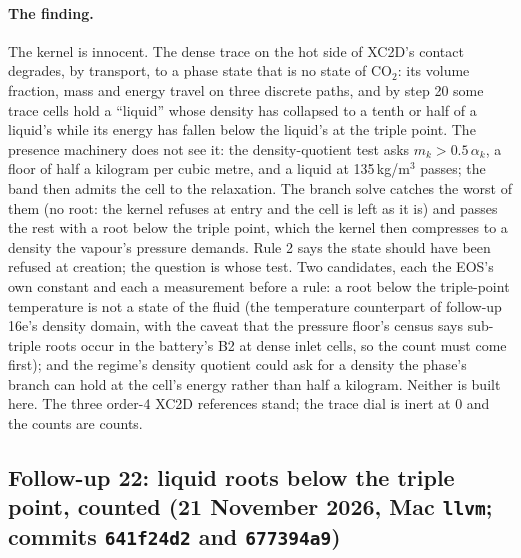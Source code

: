 \documentclass[11pt,a4paper]{article}
\newcommand{\code}[1]{\texttt{\small #1}}
\begin{document}
\paragraph{The finding.}  The kernel is innocent.  The dense trace on
the hot side of XC2D's contact degrades, by transport, to a phase state
that is no state of CO$_2$: its volume fraction, mass and energy travel
on three discrete paths, and by step 20 some trace cells hold a
``liquid'' whose density has collapsed to a tenth or half of a liquid's
while its energy has fallen below the liquid's at the triple point.  The
presence machinery does not see it: the density-quotient test asks
$m_k > 0.5\,\alpha_k$, a floor of half a kilogram per cubic metre, and a
liquid at 135\,kg/m$^3$ passes; the band then admits the cell to the
relaxation.  The branch solve catches the worst of them (no root: the
kernel refuses at entry and the cell is left as it is) and passes the
rest with a root below the triple point, which the kernel then
compresses to a density the vapour's pressure demands.  Rule 2 says the
state should have been refused at creation; the question is whose test.
Two candidates, each the EOS's own constant and each a measurement
before a rule: a root below the triple-point temperature is not a state
of the fluid (the temperature counterpart of follow-up 16e's density
domain, with the caveat that the pressure floor's census says sub-triple
roots occur in the battery's B2 at dense inlet cells, so the count must
come first); and the regime's density quotient could ask for a density
the phase's branch can hold at the cell's energy rather than half a
kilogram.  Neither is built here.  The three order-4 XC2D references
stand; the trace dial is inert at 0 and the counts are counts.


\subsection{Follow-up 22: liquid roots below the triple point, counted (21 November 2026, Mac \code{llvm}; commits \code{641f24d2} and \code{677394a9})}
\end{document}

